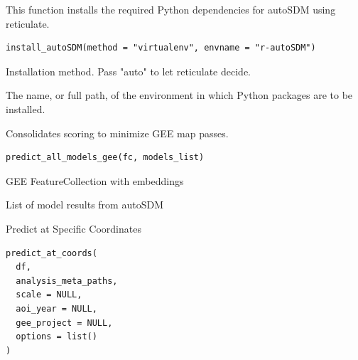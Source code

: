\documentclass[letterpaper]{book}
\begin{document}
%
\begin{Description}
This function installs the required Python dependencies for autoSDM
using reticulate.
\end{Description}
%
\begin{Usage}
\begin{verbatim}
install_autoSDM(method = "virtualenv", envname = "r-autoSDM")
\end{verbatim}
\end{Usage}
%
\begin{Arguments}
\begin{ldescription}
\item[\code{method}] Installation method. Pass "auto" to let reticulate decide.

\item[\code{envname}] The name, or full path, of the environment in which Python packages are to be installed.
\end{ldescription}
\end{Arguments}
%
\begin{Description}
Consolidates scoring to minimize GEE map passes.
\end{Description}
%
\begin{Usage}
\begin{verbatim}
predict_all_models_gee(fc, models_list)
\end{verbatim}
\end{Usage}
%
\begin{Arguments}
\begin{ldescription}
\item[\code{fc}] GEE FeatureCollection with embeddings

\item[\code{models\_list}] List of model results from autoSDM
\end{ldescription}
\end{Arguments}
%
\begin{Description}
Predict at Specific Coordinates
\end{Description}
%
\begin{Usage}
\begin{verbatim}
predict_at_coords(
  df,
  analysis_meta_paths,
  scale = NULL,
  aoi_year = NULL,
  gee_project = NULL,
  options = list()
)
\end{verbatim}
\end{Usage}
\end{document}
